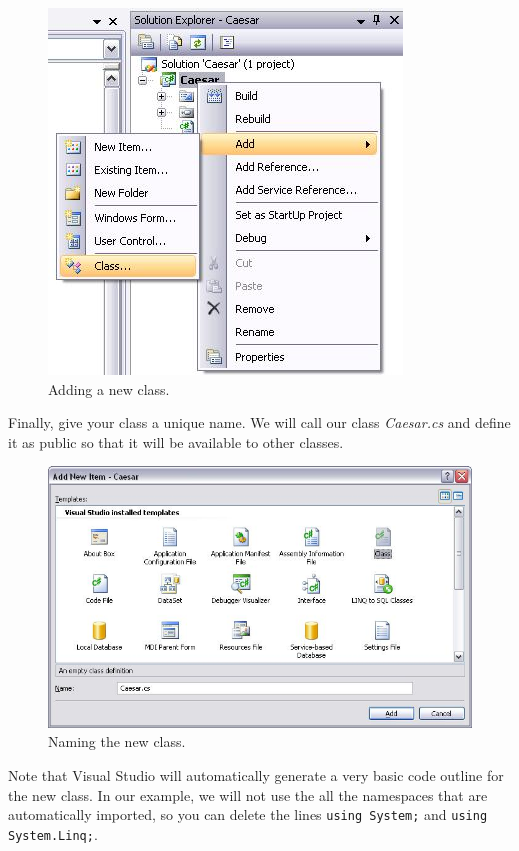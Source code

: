 \begin{figure}[h]
	\centering
		\includegraphics{figures/add_new_class.jpg}
	\caption{Adding a new class.}
	\label{fig:add_new_class}
\end{figure}
\clearpage

\noindent Finally, give your class a unique name. We will call our class \textit{Caesar.cs} and define it as public so that it will be available to other classes.

\begin{figure}[h!]
	\centering
		\includegraphics[width=1.00\textwidth]{figures/name_new_class.jpg}
	\caption{Naming the new class.}
	\label{fig:name_new_class}
\end{figure}

Note that Visual Studio will automatically generate a very basic code outline for the new class. In our example, we will not use the all the namespaces that are automatically imported, so you can delete the lines \texttt{using System;} and \texttt{using System.Linq;}.

